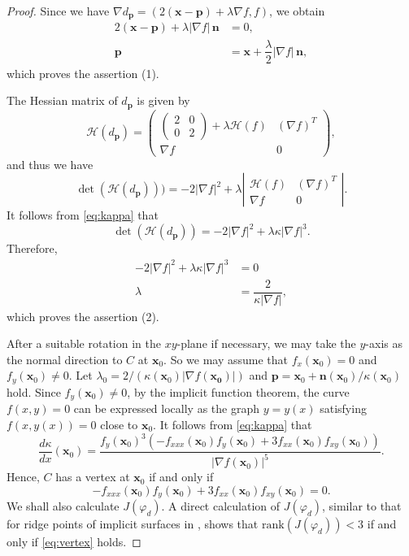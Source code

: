 \documentclass[12pt]{amsart}
\theoremstyle{plain}
\theoremstyle{definition}
\newcommand{\n}{\mathbf{n}}
\newcommand{\x}{\mathbf{x}}
\newcommand{\p}{\mathbf{p}}
\renewcommand{\phi}{\varphi}
\newcommand{\rank}{\mathrm{rank}}
\begin{document}
\begin{proof}
Since we have $\nabla d_\p=(2(\x-\p)+\lambda \nabla f,f)$, we obtain 
\begin{align*}
2(\x-\p)+\lambda |\nabla f|\,\n& =0, \\
\p&=\x+\dfrac{\lambda}2|\nabla f|\,\n,
\end{align*} 
which proves the assertion (1). 

The Hessian matrix of $d_\p$ is given by
$$
\mathcal{H}(d_\p) = 
\begin{pmatrix}
\begin{pmatrix}2&0\\0&2\end{pmatrix}+\lambda \mathcal{H}(f) & (\nabla f)^T\\
\nabla f & 0
\end{pmatrix},
$$
and thus we have
$$
\det(\mathcal{H}(d_\p))) = -2|\nabla f|^2+\lambda\left|\begin{matrix}\mathcal{H}(f)&(\nabla f)^T\\\nabla f&0\end{matrix}\right|.
$$
It follows from \eqref{eq:kappa} that 
$$
\det(\mathcal{H}(d_\p))=-2|\nabla f|^2+\lambda \kappa |\nabla f|^3.
$$
Therefore, 
\begin{align*}
-2|\nabla f|^2+\lambda \kappa |\nabla f|^3 & = 0 \\
\lambda & = \dfrac2{\kappa |\nabla f|},
\end{align*}
which proves the assertion (2). 

After a suitable rotation in the $xy$-plane if necessary, we may take
the $y$-axis as the normal direction to $C$ at $\x_0$. 
So we may assume that $f_x(\x_0)=0$ and $f_y(\x_0)\ne0$.  
Let $\lambda_0=2/(\kappa(\x_0)|\nabla f(\bm{x_0})|)$ and $\p=\x_0+\n(\x_0)/\kappa(\x_0)$ hold. 
Since $f_y(\x_0)\ne0$, by the implicit function theorem, the curve $f(x,y)=0$ can be expressed locally as the graph $y=y(x)$ satisfying $f(x,y(x))=0$ close to $\x_0$. 
It follows from \eqref{eq:kappa} that 
\begin{equation*}
\dfrac{d\kappa}{dx}(\x_0)=\dfrac{f_y(\x_0)^3(-f_{xxx}(\x_0)f_y(\x_0)+3f_{xx}(\x_0)f_{xy}(\x_0))}{|\nabla f(\x_0)|^5}.
\end{equation*}
Hence, $C$ has a vertex at $\x_0$ if and only if 
\begin{equation}
\label{eq:vertex}
-f_{xxx}(\x_0)f_y(\x_0)+3f_{xx}(\x_0)f_{xy}(\x_0)=0.
\end{equation}
We shall also calculate $J(\phi_d)$. 
A direct calculation of $J(\phi_d)$, similar to that for ridge points
of implicit surfaces in \cite{Hasegawa2017}, shows that $\rank(J(\phi_d))<3$ if and only if \eqref{eq:vertex} holds. 
\end{proof}
\end{document}
